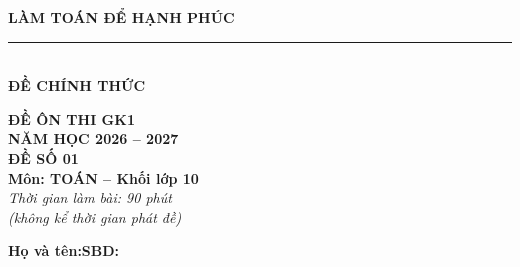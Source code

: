 \documentclass[12pt,a4paper]{article}
\begin{document}
\noindent
\begin{minipage}[c]{0.38\textwidth}
    \centering
    \textbf{LÀM TOÁN ĐỂ HẠNH PHÚC}\\[-2pt]
    \rule{3.2cm}{0.6pt}\\[4pt]
    \textbf{ĐỀ CHÍNH THỨC}
\end{minipage}\hfill
\begin{minipage}[c]{0.35\textwidth}
    \centering
    \textbf{ĐỀ ÔN THI GK1}\\
    \textbf{NĂM HỌC 2026 -- 2027}\\[2pt]
    \textbf{ĐỀ SỐ 01}\\
    \textbf{Môn: TOÁN -- Khối lớp 10}\\
    \textit{\small Thời gian làm bài: 90 phút\\(không kể thời gian phát đề)}
\end{minipage}

\vspace{0.2cm}
\noindent
\begin{minipage}[b]{0.78\textwidth}
    \textbf{Họ và tên:}\dotfill\textbf{SBD:}\makebox[3.5cm]{\dotfill}
\end{minipage}\hfill
\begin{minipage}[b]{0.20\textwidth}
    \hfill
    \setlength{\fboxrule}{0.8pt}%
\end{minipage}
\vspace{0.2cm}
\end{document}

